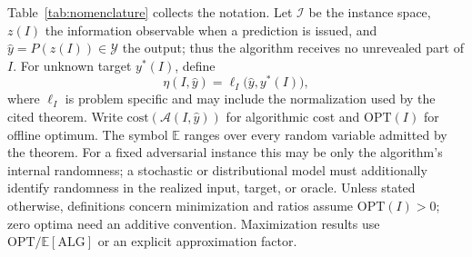 \documentclass[acmsmall,screen,nonacm]{acmart}
\theoremstyle{acmdefinition}%
\begin{document}
Table~\ref{tab:nomenclature} collects the notation. Let $\mathcal I$ be the instance space, $z(I)$ the information observable when a prediction is issued, and $\hat y=P(z(I))\in\mathcal Y$ the output; thus the algorithm receives no unrevealed part of $I$. For unknown target $y^*(I)$, define
\begin{equation}
    \eta(I,\hat y) = \ell_I \big(\hat{y}, y^*(I) \big),
    \label{eq_error}
\end{equation}
where $\ell_I$ is problem specific and may include the normalization used by the cited theorem. Write $\mathrm{cost}(\mathcal A(I,\hat y))$ for algorithmic cost and $\mathrm{OPT}(I)$ for offline optimum. The symbol $\mathbb E$ ranges over every random variable admitted by the theorem. For a fixed adversarial instance this may be only the algorithm's internal randomness; a stochastic or distributional model must additionally identify randomness in the realized input, target, or oracle. Unless stated otherwise, definitions concern minimization and ratios assume $\mathrm{OPT}(I)>0$; zero optima need an additive convention. Maximization results use $\mathrm{OPT}/\mathbb E[\mathrm{ALG}]$ or an explicit approximation factor.
\end{document}

